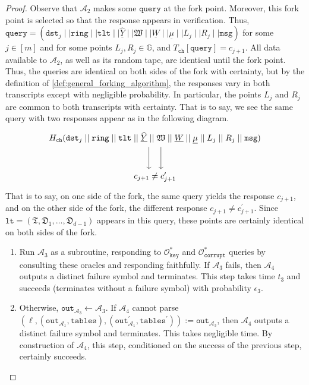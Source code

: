\documentclass[11pt]{article}
\theoremstyle{definition}
\newcommand{\G}{\mathbb{G}}
\newcommand{\lt}{\texttt{lt}}
\newcommand{\tlt}{\texttt{tlt}}
\newcommand{\ring}{\texttt{ring}}
\newcommand{\msg}{\texttt{msg}}
\newcommand{\corruptionOracle}{\mathcal{O}_{\texttt{corrupt}}}
\newcommand{\keyOracle}{\mathcal{O}_{\texttt{key}}}
\newcommand{\signaturequery}{(\texttt{dst}_{j} \mid \mid \ring \mid \mid \tlt \mid \mid \underline{\widehat{Y}} \mid \mid \mathfrak{W} \mid \mid \underline{W} \mid \mid \underline{\mu} \mid \mid L_{j} \mid \mid R_{j} \mid \mid \msg)}
\begin{document}
\begin{proof}
Observe that $\mathcal{A}_2$ makes some $\texttt{query}$ at the fork point. Moreover, this fork point is selected so that the response appears in verification. Thus, $\texttt{query} = \signaturequery$ for some $j \in [m]$ and for some points $L_j, R_j \in \G$, and $T_{\texttt{ch}}[\texttt{query}] = c_{j+1}$. All data available to $\mathcal{A}_2$, as well as its random tape, are identical until the fork point. Thus, the queries are identical on both sides of the fork with certainty, but by the definition of \cref{def:general_forking_algorithm}, the responses vary in both transcripts except with negligible probability. In particular, the points $L_j$ and $R_j$ are common to both transcripts with certainty.  That is to say, we see the same query with two responses appear as in the following diagram.
\[
\begin{tikzcd}[row sep=large, column sep=0pt] %
    H_{\texttt{ch}}\signaturequery \arrow[d, shift left, shift left, shift left] \arrow[d, shift right, shift right, shift right] \\
    c_{j+1} \neq c^\prime_{j+1}
\end{tikzcd}
\]
That is to say, on one side of the fork, the same query yields the response $c_{j+1}$, and on the other side of the fork, the different response $c_{j+1}\neq c_{j+1}^\prime$.
Since $\lt = (\mathfrak{T}, \mathfrak{D}_1, \ldots, \mathfrak{D}_{d-1})$ appears in this query, these points are certainly identical on both sides of the fork. 
\begin{enumerate}
\item Run $\mathcal{A}_3$ as a subroutine, responding to $\keyOracle^*$ and $\corruptionOracle^*$ queries by consulting these oracles and responding faithfully.  If $\mathcal{A}_3$ fails, then $\mathcal{A}_4$ outputs a distinct failure symbol and terminates. This step takes time $t_3$ and succeeds (terminates without a failure symbol) with probability $\epsilon_3$.

\item Otherwise, $\texttt{out}_{\mathcal{A}_3} \leftarrow \mathcal{A}_3$. If $\mathcal{A}_4$ cannot parse $(\ell, (\texttt{out}_{\mathcal{A}_1}, \texttt{tables}), (\texttt{out}_{\mathcal{A}_1}^\prime, \texttt{tables}^\prime)) := \texttt{out}_{\mathcal{A}_3}$, then $\mathcal{A}_4$ outputs a distinct failure symbol and terminates. This takes negligible time. By construction of $\mathcal{A}_4$, this step, conditioned on the success of the previous step, certainly succeeds.


\end{enumerate}
\end{proof}
\end{document}
